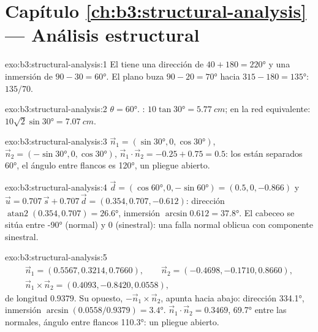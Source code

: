 \section*{Capítulo \ref{ch:b3:structural-analysis} --- Análisis estructural}

\begin{solution}{exo:b3:structural-analysis:1}
El  tiene una dirección de $40 + 180 = \ang{220}$ y una inmersión de $90 - 30 = \ang{60}$. El
plano buza $90 - 20 = \ang{70}$ hacia $315 - 180 = \ang{135}$: $135/70$.
\end{solution}

\begin{solution}{exo:b3:structural-analysis:2}
$\theta = \ang{60}$. : $10\tan\ang{30} = \qty{5.77}{cm}$;
en la red equivalente: $10\sqrt2\sin\ang{30} = \qty{7.07}{cm}$.
\end{solution}

\begin{solution}{exo:b3:structural-analysis:3}
$\vec n_1 = (\sin\ang{30}, 0, \cos\ang{30})$, $\vec n_2 = (-\sin\ang{30}, 0,
\cos\ang{30})$, $\vec n_1\cdot\vec n_2 = -0.25 + 0.75 = 0.5$: los  están
separados \ang{60}, el ángulo entre flancos es \ang{120}, un pliegue abierto.
\end{solution}

\begin{solution}{exo:b3:structural-analysis:4}
$\vec d = (\cos\ang{60}, 0, -\sin\ang{60}) = (0.5, 0, -0.866)$ y $\vec u =
0.707\,\vec s + 0.707\,\vec d = (0.354, 0.707, -0.612)$: dirección
$\operatorname{atan2}(0.354, 0.707) = \ang{26.6}$, inmersión $\arcsin0.612 =
\ang{37.8}$. El cabeceo se sitúa entre \ang{-90} (normal) y 0 (sinestral): una
falla normal oblicua con componente sinestral.
\end{solution}

\begin{solution}{exo:b3:structural-analysis:5}
\begin{gather*}
  \vec n_1 = (0.5567, 0.3214, 0.7660),\qquad \vec n_2 = (-0.4698, -0.1710, 0.8660),\\
  \vec n_1\times\vec n_2 = (0.4093, -0.8420, 0.0558),
\end{gather*}
\sloppy de longitud $0.9379$. Su opuesto, $-\vec n_1\times\vec n_2$, apunta hacia abajo:
dirección \ang{334.1}, inmersión $\arcsin(0.0558/0.9379) = \ang{3.4}$. $\vec n_1\cdot\vec
n_2 = 0.3469$, \ang{69.7} entre las normales, ángulo entre flancos \ang{110.3}:
un pliegue abierto.
\end{solution}

